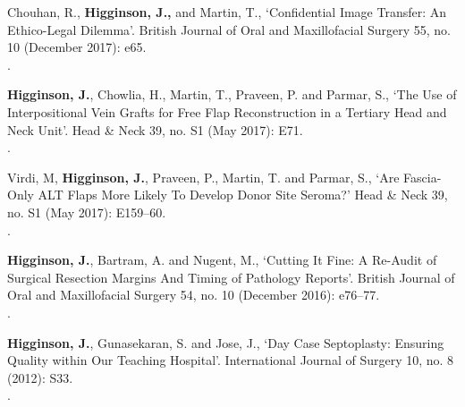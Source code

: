 \vspace{0.1cm}

 Chouhan, R., \textbf{Higginson, J.,} and Martin, T., `Confidential Image Transfer: An Ethico-Legal Dilemma’. British Journal of Oral and Maxillofacial Surgery 55, no. 10 (December 2017): e65.
\\.

\vspace{0.1cm}

 \textbf{Higginson, J.}, Chowlia, H., Martin, T., Praveen, P. and Parmar, S., `The Use of Interpositional Vein Grafts for Free Flap Reconstruction in a Tertiary Head and Neck Unit’. Head \& Neck 39, no. S1 (May 2017): E71. 
\\.

\vspace{0.1cm}

 Virdi, M, \textbf{Higginson, J.}, Praveen, P., Martin, T. and Parmar, S., `Are Fascia-Only ALT Flaps More Likely To Develop Donor Site Seroma?’ Head \& Neck 39, no. S1 (May 2017): E159–60. 
\\.

\vspace{0.1cm}

 \textbf{Higginson, J.}, Bartram, A. and Nugent, M., `Cutting It Fine: A Re-Audit of Surgical Resection Margins And Timing of Pathology Reports’. British Journal of Oral and Maxillofacial Surgery 54, no. 10 (December 2016): e76–77. 
\\.

\vspace{0.1cm}

 \textbf{Higginson, J.}, Gunasekaran, S. and Jose, J., `Day Case Septoplasty: Ensuring Quality within Our Teaching Hospital’. International Journal of Surgery 10, no. 8 (2012): S33. 
\\.



